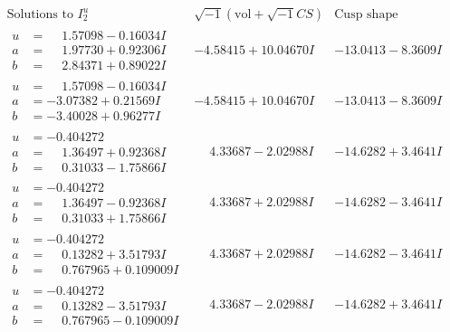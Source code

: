 \documentclass[1p]{elsarticle_modified}
\theoremstyle{definition}
\newcommand{\I}{\sqrt{-1}}
\begin{document}
$$\begin{array}{c|c|c}
\text{Solutions to }I^u_{2}& \I (\text{vol} + \sqrt{-1}CS) & \text{Cusp shape}\\
 \hline 
\begin{aligned}
u &= \phantom{-}1.57098 - 0.16034 I \\
a &= \phantom{-}1.97730 + 0.92306 I \\
b &= \phantom{-}2.84371 + 0.89022 I\end{aligned}
 & -4.58415 + 10.04670 I & -13.0413 - 8.3609 I \\ \hline\begin{aligned}
u &= \phantom{-}1.57098 - 0.16034 I \\
a &= -3.07382 + 0.21569 I \\
b &= -3.40028 + 0.96277 I\end{aligned}
 & -4.58415 + 10.04670 I & -13.0413 - 8.3609 I \\ \hline\begin{aligned}
u &= -0.404272\phantom{ +0.000000I} \\
a &= \phantom{-}1.36497 + 0.92368 I \\
b &= \phantom{-}0.31033 - 1.75866 I\end{aligned}
 & \phantom{-}4.33687 - 2.02988 I & -14.6282 + 3.4641 I \\ \hline\begin{aligned}
u &= -0.404272\phantom{ +0.000000I} \\
a &= \phantom{-}1.36497 - 0.92368 I \\
b &= \phantom{-}0.31033 + 1.75866 I\end{aligned}
 & \phantom{-}4.33687 + 2.02988 I & -14.6282 - 3.4641 I \\ \hline\begin{aligned}
u &= -0.404272\phantom{ +0.000000I} \\
a &= \phantom{-}0.13282 + 3.51793 I \\
b &= \phantom{-}0.767965 + 0.109009 I\end{aligned}
 & \phantom{-}4.33687 + 2.02988 I & -14.6282 - 3.4641 I \\ \hline\begin{aligned}
u &= -0.404272\phantom{ +0.000000I} \\
a &= \phantom{-}0.13282 - 3.51793 I \\
b &= \phantom{-}0.767965 - 0.109009 I\end{aligned}
 & \phantom{-}4.33687 - 2.02988 I & -14.6282 + 3.4641 I \\ \hline\begin{aligned}

\end{aligned}
\end{array}$$
\end{document}
